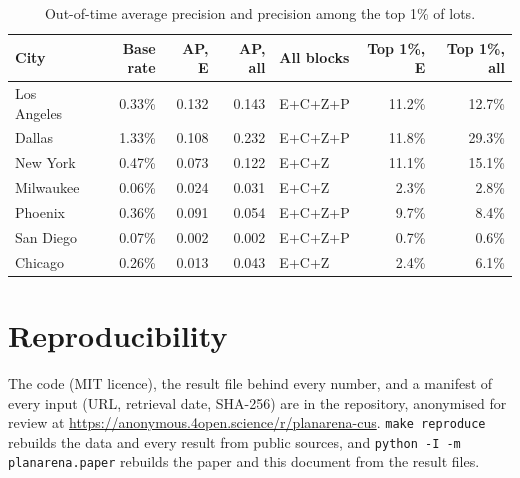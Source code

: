 \documentclass[10pt]{article}
\begin{document}
\begin{table}[h!]
\centering
\small
\setlength{\tabcolsep}{4pt}
\caption{Out-of-time average precision and precision among the top 1\% of lots.}
\label{tab:ap}
\begin{tabular}{lrrrlrr}
\toprule
City & Base rate & AP, E & AP, all & All blocks & Top 1\%, E & Top 1\%, all \\
\midrule
Los Angeles & 0.33\% & 0.132 & 0.143 & E+C+Z+P & 11.2\% & 12.7\% \\
Dallas & 1.33\% & 0.108 & 0.232 & E+C+Z+P & 11.8\% & 29.3\% \\
New York & 0.47\% & 0.073 & 0.122 & E+C+Z & 11.1\% & 15.1\% \\
Milwaukee & 0.06\% & 0.024 & 0.031 & E+C+Z & 2.3\% & 2.8\% \\
Phoenix & 0.36\% & 0.091 & 0.054 & E+C+Z+P & 9.7\% & 8.4\% \\
San Diego & 0.07\% & 0.002 & 0.002 & E+C+Z+P & 0.7\% & 0.6\% \\
Chicago & 0.26\% & 0.013 & 0.043 & E+C+Z & 2.4\% & 6.1\% \\
\bottomrule
\end{tabular}
\end{table}

\FloatBarrier
\section{Reproducibility}\label{s:repro}

The code (MIT licence), the result file behind every number, and a manifest of every input (URL, retrieval date,
SHA-256) are in the repository, anonymised for review at \url{https://anonymous.4open.science/r/planarena-cus}. \texttt{make reproduce} rebuilds the data
and every result from public sources, and \texttt{python -I -m planarena.paper} rebuilds the paper and this document
from the result files.
\end{document}
